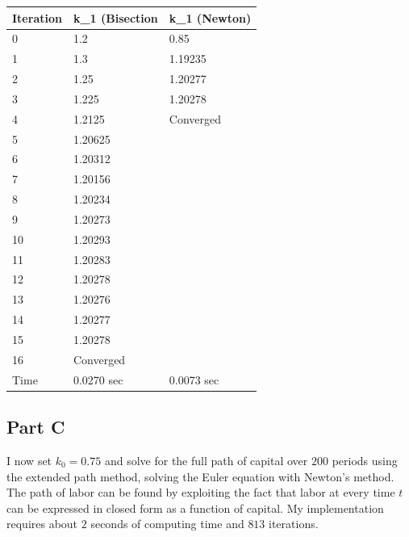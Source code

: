 \documentclass[12pt, letterpaper, parskip = full]{article}
\begin{document}
\begin{table}[]
\begin{tabular}{|l|ll|}
\hline
Iteration & \multicolumn{1}{l|}{k\_1 (Bisection} & k\_1 (Newton) \\ \hline
0         & 1.2                                  & 0.85          \\
1         & 1.3                                  & 1.19235       \\
2         & 1.25                                 & 1.20277       \\
3         & 1.225                                & 1.20278       \\
4         & 1.2125                               & Converged     \\
5         & 1.20625                              &               \\
6         & 1.20312                              &               \\
7         & 1.20156                              &               \\
8         & 1.20234                              &               \\
9         & 1.20273                              &               \\
10        & 1.20293                              &               \\
11        & 1.20283                              &               \\
12        & 1.20278                              &               \\
13        & 1.20276                              &               \\
14        & 1.20277                              &               \\
15        & 1.20278                              &               \\
16        & Converged                            &               \\ \hline
Time      & 0.0270 sec                           & 0.0073 sec    \\ \hline
\end{tabular}
\end{table}

\subsection{Part C}

I now set \(k_0 = 0.75\) and solve for the full path of capital over \(200\) periods using the extended path method, solving the Euler equation with Newton's method. The path of labor can be found by exploiting the fact that labor at every time \(t\) can be expressed in closed form as a function of capital. My implementation requires about \(2\) seconds of computing time and \(813\) iterations.
\end{document}
